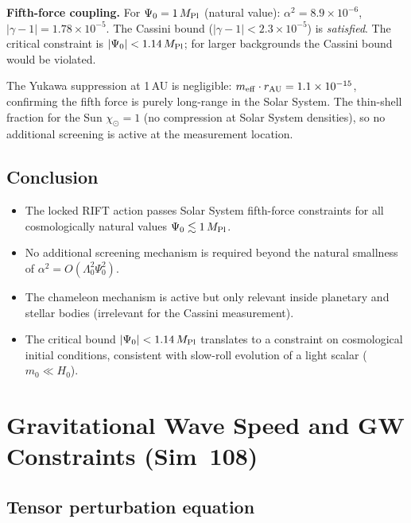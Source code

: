 \documentclass[12pt,a4paper]{article}
\begin{document}
\textbf{Fifth-force coupling.}
For $\Psi_0 = 1\,M_{\rm Pl}$ (natural value):
$\alpha^2 = 8.9\times10^{-6}$,
$|\gamma-1| = 1.78\times10^{-5}$.
The Cassini bound ($|\gamma-1|<2.3\times10^{-5}$) is \emph{satisfied}.
The critical constraint is $|\Psi_0| < 1.14\,M_{\rm Pl}$; for larger backgrounds
the Cassini bound would be violated.

The Yukawa suppression at 1\,AU is negligible:
$m_{\rm eff}\cdot r_{\rm AU} = 1.1\times10^{-15}$, confirming the fifth force is
purely long-range in the Solar System.  The thin-shell fraction for the Sun
$\chi_\odot = 1$ (no compression at Solar System densities), so no
additional screening is active at the measurement location.

\subsection{Conclusion}

\begin{itemize}
  \item The locked RIFT action passes Solar System fifth-force constraints
        for all cosmologically natural values $\Psi_0 \lesssim 1\,M_{\rm Pl}$.
  \item No additional screening mechanism is required beyond the natural
        smallness of $\alpha^2 = O(\Lambda_0^2\Psi_0^2)$.
  \item The chameleon mechanism is active but only relevant inside planetary
        and stellar bodies (irrelevant for the Cassini measurement).
  \item The critical bound $|\Psi_0| < 1.14\,M_{\rm Pl}$ translates to a
        constraint on cosmological initial conditions, consistent with slow-roll
        evolution of a light scalar ($m_0 \ll H_0$).
\end{itemize}

\section{Gravitational Wave Speed and GW Constraints (Sim~108)}
\label{sec:sim108}

\subsection{Tensor perturbation equation}
\end{document}
